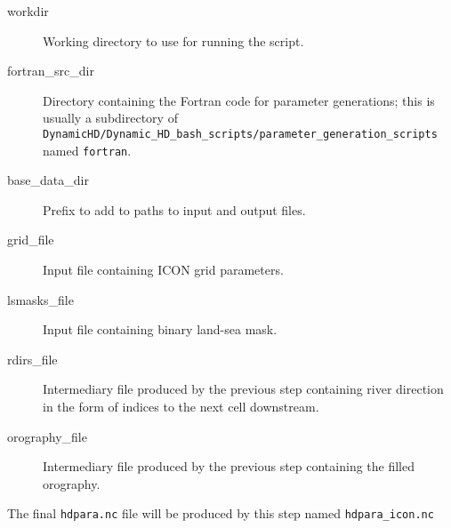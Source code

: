 \documentclass{article}
\begin{document}
\begin{enumerate}
\begin{description}
\item[workdir] Working directory to use for running the script.
\item[fortran\_src\_dir] Directory containing the Fortran code for parameter generations; this is usually a subdirectory of  \lstinline[style=bash_input]{DynamicHD/Dynamic_HD_bash_scripts/parameter_generation_scripts} named \lstinline[style=bash_input]{fortran}.
\item[base\_data\_dir] Prefix to add to paths to input and output files.
\item[grid\_file] Input file containing ICON grid parameters.
\item[lsmasks\_file] Input file containing binary land-sea mask.
\item[rdirs\_file] Intermediary file produced by the previous step containing river direction in the form of indices to the next cell downstream.
\item[orography\_file] Intermediary file produced by the previous step containing the filled orography.
\end{description}
The final \lstinline[style=bash_input]{hdpara.nc} file will be produced by this step named \lstinline[style=bash_input]{hdpara_icon.nc}
\end{enumerate}


{}

\end{document}
